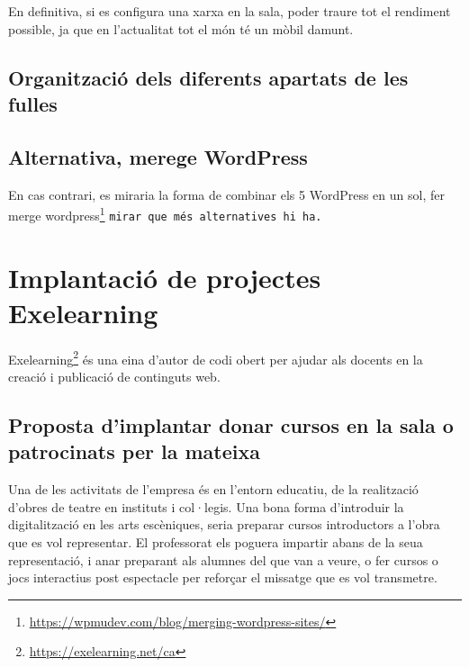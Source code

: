 \documentclass[
  10pt,
]{krantz}
\DeclareRobustCommand{\href}[2]{#2\footnote{\url{#1}}}
\begin{document}
En definitiva, si es configura una xarxa en la sala, poder traure tot el rendiment possible, ja que en l'actualitat tot el món té un mòbil damunt.

\hypertarget{organitzaciuxf3-dels-diferents-apartats-de-les-fulles}{%
\section{Organització dels diferents apartats de les fulles}\label{organitzaciuxf3-dels-diferents-apartats-de-les-fulles}}

\hypertarget{alternativa-merege-wordpress}{%
\section{Alternativa, merege WordPress}\label{alternativa-merege-wordpress}}

En cas contrari, es miraria la forma de combinar els 5 WordPress en un sol, fer \href{https://wpmudev.com/blog/merging-wordpress-sites/}{merge wordpress} \texttt{mirar\ que\ més\ alternatives\ hi\ ha.}

\hypertarget{implantaciuxf3-de-projectes-exelearning}{%
\chapter{Implantació de projectes Exelearning}\label{implantaciuxf3-de-projectes-exelearning}}

\href{https://exelearning.net/ca}{Exelearning} és una eina d'autor de codi obert per ajudar als docents en la creació i publicació de continguts web.

\hypertarget{proposta-dimplantar-donar-cursos-en-la-sala-o-patrocinats-per-la-mateixa}{%
\section{Proposta d'implantar donar cursos en la sala o patrocinats per la mateixa}\label{proposta-dimplantar-donar-cursos-en-la-sala-o-patrocinats-per-la-mateixa}}

Una de les activitats de l'empresa és en l'entorn educatiu, de la realització d'obres de teatre en instituts i col·legis. Una bona forma d'introduir la digitalització en les arts escèniques, seria preparar cursos introductors a l'obra que es vol representar. El professorat els poguera impartir abans de la seua representació, i anar preparant als alumnes del que van a veure, o fer cursos o jocs interactius post espectacle per reforçar el missatge que es vol transmetre.
\end{document}
